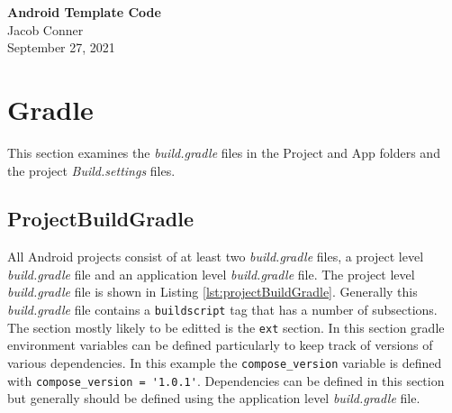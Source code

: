 \documentclass[12pt]{article}
\begin{document}
\begin{centering}
{\large\textbf{Android Template Code}}\\ %
Jacob Conner\\                     %
September 27, 2021\\                      %
\end{centering}

\tableofcontents

\section{Gradle}
This section examines the \textit{build.gradle} files in the Project and App folders and the project \textit{Build.settings} files. 
\newpage
\subsection{ProjectBuildGradle}

All Android projects consist of at least two \textit{build.gradle} files, a project level \textit{build.gradle} file and an application level \textit{build.gradle} file. The project level \textit{build.gradle} file is shown in Listing  \ref{lst:projectBuildGradle}. Generally this 
\textit{build.gradle} file contains a \verb|buildscript| tag that has a number of subsections. The section mostly likely to be 
editted is the \verb|ext| section. In this section gradle environment variables can be defined particularly to keep track 
of versions of various dependencies. In this example the \verb|compose_version| variable is defined with \verb|compose_version = '1.0.1'|. Dependencies can be defined in this section but generally should be defined using the application level \textit{build.gradle} file. 

\newpage
\end{document}
